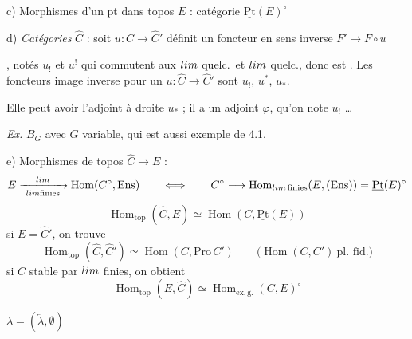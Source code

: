 \documentclass[11pt,a4paper]{article}
\begin{document}

c) Morphismes d'un pt dans \ill{} topos $E$ : catégorie
 $\underline{\mathrm{Pt}}(E)^{\circ}$

d) \emph{Catégories} $\widehat{C}$ : soit \struck{\ill{}} $u : C \to
\widehat{C}'$ définit un foncteur en sens inverse $F' \mapsto F \circ u$


, notés $u_{!}$ et $u^{!}$ qui commutent aux
$\varprojlim$ quelc.\ et \ill{} $\varinjlim$ quelc., donc est \ill{}
. Les foncteurs image inverse pour un $u : \widehat{C}
\to \widehat{C}'$ sont $u_{!}$, $u^{*}$, $u_{*}$.


Elle peut avoir l'adjoint à droite $u_{*}$ ; il a un adjoint $\varphi$, qu'on note
$u_{!}$ \ldots

\emph{Ex.} $B_{G}$ avec $G$ variable, qui est aussi exemple de 4.1.

e) Morphismes \ill{} de topos $\widehat{C} \to E$ :
\[
E \xrightarrow[\ \varprojlim \text{finies}\ ]{\ \varprojlim\ }
\operatorname{Hom}(C^{\circ}, \mathrm{Ens})
\qquad \Longleftrightarrow \qquad
C^{\circ} \longrightarrow \operatorname{Hom}_{\varprojlim\,\text{finies}}
(E, (\mathrm{Ens})) = \underline{\mathrm{Pt}}(E)^{\circ}
\]
\[
\operatorname{Hom}_{\mathrm{top}}(\widehat{C}, E) \simeq
\operatorname{Hom}(C, \underline{\mathrm{Pt}}(E))
\]
si $E = \widehat{C}'$, on trouve
\[
\operatorname{Hom}_{\mathrm{top}}(\widehat{C}, \widehat{C}') \simeq
\operatorname{Hom}(C, \mathrm{Pro}\,C')
\qquad \bigl(\operatorname{Hom}(C, C')\ \text{pl.\ fid.}\bigr)
\]
si $C$ stable par $\varprojlim$ finies, on obtient
\[
\operatorname{Hom}_{\mathrm{top}}(E, \widehat{C}) \simeq
\operatorname{Hom}_{\mathrm{ex.\,g.}}(C, E)^{\circ}
\]

$\lambda = (\underleftarrow{\lambda}, \emptyset)$

\end{document}
